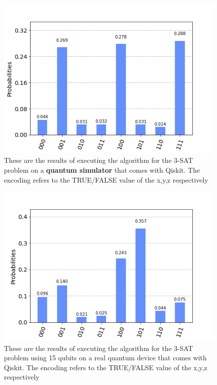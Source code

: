 \begin{figure}[h]
	\centering
	\includegraphics[scale = 0.75]{../Demonstration/img/simulated_3SAT.PNG}
	\caption{These are the results of executing the algorithm for the 3-SAT problem on a \textbf{quantum simulator} that comes with Qiskit. The encoding refers to the TRUE/FALSE value of the x,y,z respectively}
\end{figure}


\begin{figure}[h]
	\centering
	\includegraphics[scale = 0.75]{../Demonstration/img/real_device_3SAT.PNG}
	\caption{These are the results of executing the algorithm for the 3-SAT problem using 15 qubits on a real quantum device that comes with Qiskit. The encoding refers to the TRUE/FALSE value of the x,y,z respectively}
\end{figure}

